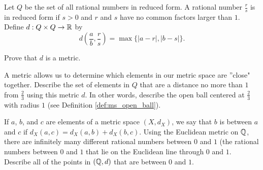 {\begin{comment}
Finally, we consider the triangle inequality. Let $a,b,c \in X$. If $a=b$, then 
\[d(a,b) = 0 \leq d(a,c) + d(c,b).\]
So we only need consider the cases where $a \neq b$. Assume $a \neq b$. If $c = a$, then 
\[d(a,b) = d(c,b) = d(a,c) + d(c,b).\]
A similar result holds if $c = b$. So the only case left to consider is if $a$, $b$, and $c$ are all distinct. In this case, $d(a,b) \leq 6$, while $d(a,c) + d(c,b) \geq 2 + 4 = 6$. So 
\[d(a,b) \leq 6 \leq 2 + 4 \leq d(a,c) + d(c,b).\]
Therefore, $d$ is a metric on $X$ and $(X,d)$ is a metric space. 


The open balls centered at $a=1$ in $X$ are 
\begin{align*}
B(1,r) &= \{1\} \text{ if } r \leq 2, \\
B(1,r) &= \{1,3\} \text{ if } 2 < r \leq 4, \\
B(1,r) &= \{1,3,5\} \text{ if } 4 < r. 
\end{align*}

\ea

\end{comment}


\item \label{ex:MS_Q_metric} Let $Q$ be the set of all rational numbers in reduced form. A rational number $\frac{r}{s}$ is in reduced form if $s > 0$ and $r$ and $s$ have no common factors larger than $1$. Define $d : Q \times Q \to \mathbb{R}$ by 
\[d\left(\frac{a}{b}, \frac{r}{s}\right) = \max\{| a-r |, | b-s |\}.\]
	\ba
	\item Prove that $d$ is a metric. 
	
	\item A metric allows us to determine which elements in our metric space are ''close" together. Describe the set of elements in $Q$ that are a distance no more than $1$ from $\frac{2}{3}$ using this metric $d$. In other words, describe the open ball centered at $\frac{2}{3}$ with radius $1$ (see Definition \ref{def:ms_open_ball}).
	
	\item If $a$, $b$, and $c$ are elements of a metric space $(X, d_X)$, we say that $b$ is between $a$ and $c$ if $d_X(a,c) = d_X(a,b) + d_X(b,c)$. Using the Euclidean metric on $\mathbb{Q}$, there are infinitely many different rational numbers between $0$ and $1$ (the rational numbers between $0$ and $1$ that lie on the Euclidean line through $0$ and $1$. Describe all of the points in $(\mathbb{Q},d)$ that are between $0$ and $1$.  
	
	\ea

\begin{comment}


\end{comment}}
